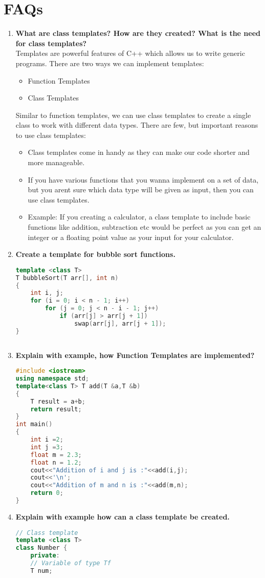 \documentclass[11pt]{article}
\begin{document}
\section{FAQs}
\begin{enumerate}
	\item \textbf{What are class templates? How are they created? What is the need for class templates?}\\
	      Templates are powerful features of C++ which allows us to write generic programs. There are two ways we can implement templates:
	      \begin{itemize}
		      \item Function Templates
		      \item Class Templates
	      \end{itemize}
	      Similar to function templates, we can use class templates to create a single class to work with different data types.
	      There are few, but important reasons to use class templates:
	      \begin{itemize}
		      \item Class templates come in handy as they can make our code shorter and more manageable.
		      \item If you have various functions that you wanna implement on a set of data, but you arent sure which data type will be given as input, then you can use class templates.
		      \item Example: If you creating a calculator, a class template to include basic functions like addition, subtraction etc would be perfect as you can get an integer or a floating point value as your input for your calculator.
	      \end{itemize}
	\item \textbf{Create a template for bubble sort functions.}\\
	      \begin{lstlisting}[language=C++]
template <class T>
T bubbleSort(T arr[], int n)
{
	int i, j;
	for (i = 0; i < n - 1; i++)
		for (j = 0; j < n - i - 1; j++)
			if (arr[j] > arr[j + 1])
				swap(arr[j], arr[j + 1]);
}
			
	\end{lstlisting}
	\item \textbf{Explain with example, how Function Templates are implemented?}\\
	      \begin{lstlisting}[language=C++]
#include <iostream>  
using namespace std;  
template<class T> T add(T &a,T &b)  
{  
	T result = a+b;  
	return result;  
}
int main()  
{  
	int i =2;  
	int j =3;  
	float m = 2.3;  
	float n = 1.2;  
	cout<<"Addition of i and j is :"<<add(i,j);  
	cout<<'\n';  
	cout<<"Addition of m and n is :"<<add(m,n);  
	return 0;  
}  
		\end{lstlisting}
	\item \textbf{Explain with example how can a class template be created.}\\
	      \begin{lstlisting}[language=C++]
// Class template
template <class T>
class Number {
	private:
	// Variable of type Tf
	T num;


\end{lstlisting}
\end{enumerate}
\end{document}
